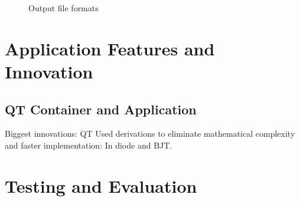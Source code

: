 \documentclass{article}
\begin{document}
\begin{figure}[h]%
    \centering
    \qquad
    \caption{Output file formats}%
    \label{fig:CalculateCurrent}%
\end{figure}






\newpage

\section{Application Features and Innovation}
\newpage
\subsection{QT Container and Application}
Biggest innovations: 
QT
Used derivations to eliminate mathematical complexity and faster implementation: In diode and BJT. 



\section{Testing and Evaluation}
\end{document}
